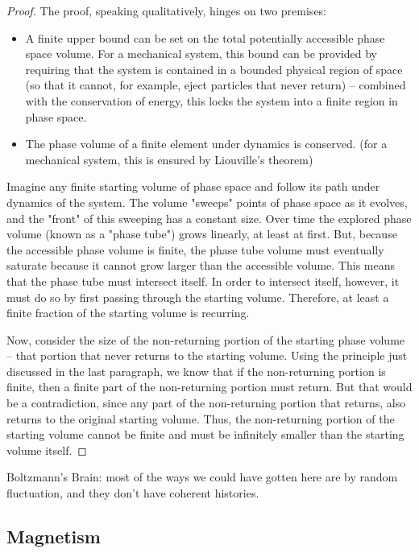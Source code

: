 \documentclass[]{article}
\begin{document}
\begin{proof}
	The proof, speaking qualitatively, hinges on two premises:
	
	\begin{itemize}
		\item 	A finite upper bound can be set on the total potentially accessible phase space volume. For a mechanical system, this bound can be provided by requiring that the system is contained in a bounded physical region of space (so that it cannot, for example, eject particles that never return) – combined with the conservation of energy, this locks the system into a finite region in phase space.
		\item The phase volume of a finite element under dynamics is conserved. (for a mechanical system, this is ensured by Liouville's theorem)
	\end{itemize}
	
	Imagine any finite starting volume of phase space and follow its path under dynamics of the system. The volume "sweeps" points of phase space as it evolves, and the "front" of this sweeping has a constant size. Over time the explored phase volume (known as a "phase tube") grows linearly, at least at first. But, because the accessible phase volume is finite, the phase tube volume must eventually saturate because it cannot grow larger than the accessible volume. This means that the phase tube must intersect itself. In order to intersect itself, however, it must do so by first passing through the starting volume. Therefore, at least a finite fraction of the starting volume is recurring.
	
	Now, consider the size of the non-returning portion of the starting phase volume – that portion that never returns to the starting volume. Using the principle just discussed in the last paragraph, we know that if the non-returning portion is finite, then a finite part of the non-returning portion must return. But that would be a contradiction, since any part of the non-returning portion that returns, also returns to the original starting volume. Thus, the non-returning portion of the starting volume cannot be finite and must be infinitely smaller than the starting volume itself.
\end{proof}
Boltzmann's Brain: most of the ways we could have gotten here are by random fluctuation, and they don't have coherent histories.


\subsection{Magnetism}
\end{document}
